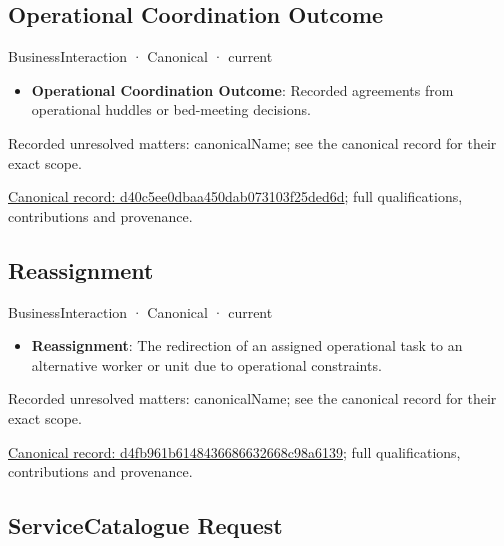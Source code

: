 \subsection{Operational Coordination Outcome}

\label{element:d40c5ee0dbaa450dab073103f25ded6d}
{\small BusinessInteraction · Canonical · current}\par

\begin{itemize}


\item \textbf{Operational Coordination Outcome}: Recorded agreements from operational huddles or bed-meeting decisions.

\end{itemize}

{\small Recorded unresolved matters: canonicalName; see the canonical record for their exact scope.}\par
{\footnotesize \href{../../../../continuum/business/business-interaction/d40c5ee0dbaa450dab073103f25ded6d.md}{Canonical record: d40c5ee0dbaa450dab073103f25ded6d}; full qualifications, contributions and provenance.}\par
\subsection{Reassignment}

\label{element:d4fb961b6148436686632668c98a6139}
{\small BusinessInteraction · Canonical · current}\par

\begin{itemize}


\item \textbf{Reassignment}: The redirection of an assigned operational task to an alternative worker or unit due to operational constraints.

\end{itemize}

{\small Recorded unresolved matters: canonicalName; see the canonical record for their exact scope.}\par
{\footnotesize \href{../../../../continuum/business/business-interaction/d4fb961b6148436686632668c98a6139.md}{Canonical record: d4fb961b6148436686632668c98a6139}; full qualifications, contributions and provenance.}\par
\subsection{ServiceCatalogue Request}

